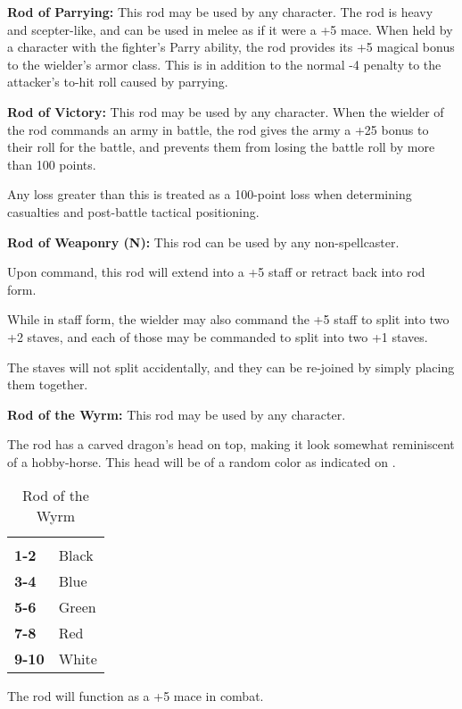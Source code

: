 \begin{multicols*}{2}
\textbf{Rod of Parrying:} This rod may be used by any character. The rod is heavy and scepter-like, and can be used in melee as if it were a +5 mace. When held by a character with the fighter's Parry ability, the rod provides its +5 magical bonus to the wielder’s armor class. This is in addition to the normal -4 penalty to the attacker’s to-hit roll caused by parrying.

\textbf{Rod of Victory:} This rod may be used by any character. When the wielder of the rod commands an army in battle, the rod gives the army a +25 bonus to their roll for the battle, and prevents them from losing the battle roll by more than 100 points.

Any loss greater than this is treated as a 100-point loss when determining casualties and post-battle tactical positioning.

\textbf{Rod of Weaponry (N):} This rod can be used by any non-spellcaster.

Upon command, this rod will extend into a +5 staff or retract back into rod form.

While in staff form, the wielder may also command the +5 staff to split into two +2 staves, and each of those may be commanded to split into two +1 staves.

The staves will not split accidentally, and they can be re-joined by simply placing them together.

\textbf{Rod of the Wyrm:} This rod may be used by any character.

The rod has a carved dragon’s head on top, making it look somewhat reminiscent of a hobby-horse. This head will be of a random color as indicated on .

\begin {table}[H]
  \caption{Rod of the Wyrm}\label{tab:Rod of the Wyrm}
  \begin{tabularx}{\columnwidth}{>{\bfseries}YY}
	 & \\
	1-2 & Black\\
	3-4 & Blue\\
	5-6 & Green\\
	7-8 & Red\\
	9-10 & White
  \end {tabularx}
\end {table}

The rod will function as a +5 mace in combat.


\end{multicols*}
